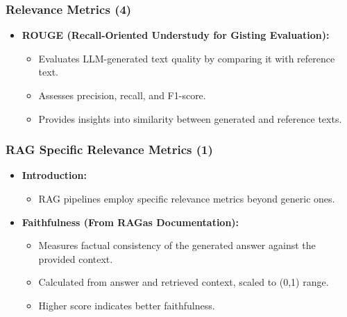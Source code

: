 \begin{frame}[fragile]\frametitle{Relevance Metrics (4)}
  \begin{itemize}
    \item \textbf{ROUGE (Recall-Oriented Understudy for Gisting Evaluation):}
      \begin{itemize}
        \item Evaluates LLM-generated text quality by comparing it with reference text.
        \item Assesses precision, recall, and F1-score.
        \item Provides insights into similarity between generated and reference texts.
      \end{itemize}
  \end{itemize}
\end{frame}

\begin{frame}[fragile]\frametitle{RAG Specific Relevance Metrics (1)}
  \begin{itemize}
    \item \textbf{Introduction:}
      \begin{itemize}
        \item RAG pipelines employ specific relevance metrics beyond generic ones.
      \end{itemize}
    \item \textbf{Faithfulness (From RAGas Documentation):}
      \begin{itemize}
        \item Measures factual consistency of the generated answer against the provided context.
        \item Calculated from answer and retrieved context, scaled to (0,1) range.
        \item Higher score indicates better faithfulness.
      \end{itemize}
  \end{itemize}
\end{frame}

